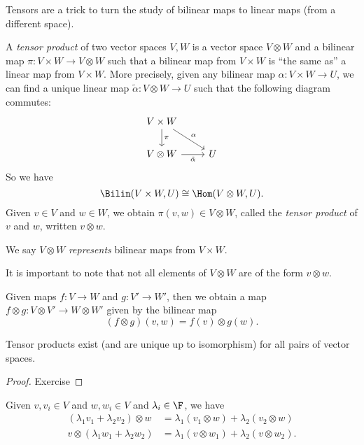 \documentclass[a4paper]{article}
\begin{document}
Tensors are a trick to turn the study of bilinear maps to linear maps (from a different space).

\begin{defi}
  A \emph{tensor product} of two vector spaces $V, W$ is a vector space $V \otimes W$ and a bilinear map $\pi: V \times W \to V \otimes W$ such that a bilinear map from $V \times W$ is ``the same as'' a linear map from $V \times W$. More precisely, given any bilinear map $\alpha: V \times W \to U$, we can find a unique linear map $\tilde{\alpha}: V \otimes W \to U$ such that the following diagram commutes:
  \[
    \begin{tikzcd}
      V \times W \ar[rd, "\alpha"] \ar[d, "\pi"] \\
      V \otimes W \ar[r, "\tilde\alpha"'] & U
    \end{tikzcd}
  \]
  So we have
  \[
    \Bilin(V \times W, U) \cong \Hom(V \otimes W, U).
  \]
  Given $v \in V$ and $w \in W$, we obtain $\pi(v, w) \in V \otimes W$, called the \emph{tensor product} of $v$ and $w$, written $v \otimes w$.
\end{defi}
We say $V \otimes W$ \emph{represents} bilinear maps from $V \times W$.

It is important to note that not all elements of $V \otimes W$ are of the form $v \otimes w$.

\begin{prop}
  Given maps $f: V \to W$ and $g: V' \to W'$, then we obtain a map $f \otimes g: V \otimes V' \to W \otimes W'$ given by the bilinear map
  \[
    (f \otimes g)(v, w) = f(v) \otimes g(w).
  \]
\end{prop}

\begin{lemma}
  Tensor products exist (and are unique up to isomorphism) for all pairs of vector spaces.
\end{lemma}

\begin{proof}
  Exercise
\end{proof}

\begin{lemma}
  Given $v, v_i \in V$ and $w, w_i \in V$ and $\lambda_i \in \F$, we have
  \begin{align*}
    (\lambda_1 v_1 + \lambda_2 v_2) \otimes w &= \lambda_1 (v_1 \otimes w) + \lambda_2 (v_2 \otimes w)\\
    v \otimes (\lambda_1 w_1 + \lambda_2 w_2) &= \lambda_1 (v \otimes w_1) + \lambda_2 (v \otimes w_2).
  \end{align*}
\end{lemma}
\end{document}
